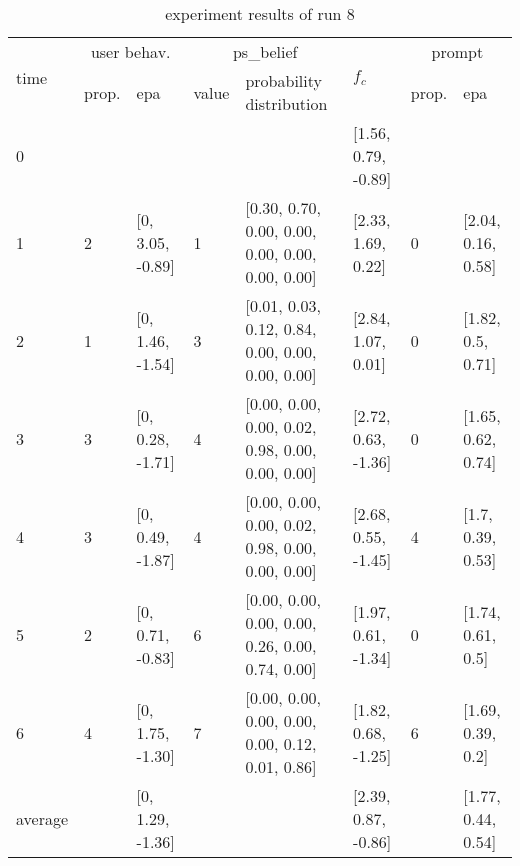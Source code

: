 \begin{table}[htbp]\footnotesize
\caption{experiment results of run 8}
\begin{tabular}{|p{0.4cm}|p{0.6cm}|l|p{0.6cm}|p{3.3cm}|l|p{0.6cm}|l|}
\hline

\multirow{2}{*}{time} & \multicolumn{2}{c|}{user behav.} & \multicolumn{2}{c|}{ps\_belief} &
\multirow{2}{*}{$f_c$} & \multicolumn{2}{c|}{prompt} \\ \cline{2-5}\cline{ 7- 8}
& prop. & epa & value & probability distribution &  & prop. & epa \\ \hline

0 & \multicolumn{1}{l|}{} &  & \multicolumn{1}{l|}{} &  & [1.56, 0.79, -0.89] & \multicolumn{1}{l|}{} &  \\ \hline
1 & 2 & [0, 3.05, -0.89] & 1 & [0.30, 0.70, 0.00, 0.00, 0.00, 0.00, 0.00, 0.00] & [2.33, 1.69, 0.22] & 0 & [2.04, 0.16, 0.58] \\ \hline
2 & 1 & [0, 1.46, -1.54] & 3 & [0.01, 0.03, 0.12, 0.84, 0.00, 0.00, 0.00, 0.00] & [2.84, 1.07, 0.01] & 0 & [1.82, 0.5, 0.71] \\ \hline
3 & 3 & [0, 0.28, -1.71] & 4 & [0.00, 0.00, 0.00, 0.02, 0.98, 0.00, 0.00, 0.00] & [2.72, 0.63, -1.36] & 0 & [1.65, 0.62, 0.74] \\ \hline
4 & 3 & [0, 0.49, -1.87] & 4 & [0.00, 0.00, 0.00, 0.02, 0.98, 0.00, 0.00, 0.00] & [2.68, 0.55, -1.45] & 4 & [1.7, 0.39, 0.53] \\ \hline
5 & 2 & [0, 0.71, -0.83] & 6 & [0.00, 0.00, 0.00, 0.00, 0.26, 0.00, 0.74, 0.00] & [1.97, 0.61, -1.34] & 0 & [1.74, 0.61, 0.5] \\ \hline
6 & 4 & [0, 1.75, -1.30] & 7 & [0.00, 0.00, 0.00, 0.00, 0.00, 0.12, 0.01, 0.86] & [1.82, 0.68, -1.25] & 6 & [1.69, 0.39, 0.2] \\ \hline
\multicolumn{1}{|l|}{average} & \multicolumn{1}{l|}{} & [0, 1.29, -1.36] & \multicolumn{1}{l|}{} &  & [2.39, 0.87, -0.86] & \multicolumn{1}{l|}{} & [1.77, 0.44, 0.54] \\ \hline
\end{tabular}
\label{}
\end{table}


